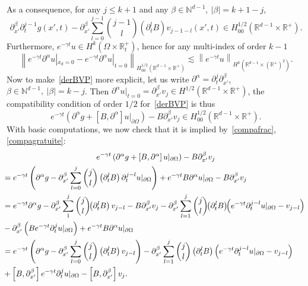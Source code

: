 \documentclass[AHL,Unicode,longabstracts,published]{cedram}
\newcommand{\R}{\mathbb{R}}
\newcommand{\N}{\mathbb{N}}
\newcommand{\N}{\mathbb{N}}
\begin{document}
As a consequence, for any $j\leq k+1$ and any $\beta\in \N^{d-1},\ |\beta|=k+1-j$,
\begin{equation}\label{compafrac}
\partial_{x'}^\beta\partial_t^{j-1}g(x',t) -\partial_{x'}^\beta\sum_{l=0}^{j-1}
\binom{j-1}{l}\left(\partial_t^lB\right)v_{j-1-l}(x',t)\in H^{1/2}_{00}\left(\R^{d-1}\times \R^+\right).
\end{equation}
Furthermore, $e^{-\gamma t}u\in H^k(\Omega
\times \R_t^+)$, hence for any multi-index of order $k-1$
\begin{equation}\label{compagratuite}
\left\|e^{-\gamma t}\partial^\alpha u|_{x_d=0} -e^{-\gamma t}\partial^\alpha u|_{t=0}\right\|_{H^{1/2}_{00}\left(\R^{d-1}\times \R^+\right)}
\lesssim \left\|e^{-\gamma t}u\right\|_{H^{k}\left(\R^{d-1}\times (\R^+)^2\right)}.
\end{equation}
Now to make~\eqref{derBVP} more explicit, let us write $\partial^\alpha=
\partial_t^{j}\partial_{x'}^\beta$, $\beta\in
\N^{d-1},\ |\beta|=k-j$. Then $\partial^\alpha u|_{t=0} =\partial_{x'}^\beta v_{j}\in H^{1/2}(\R^{d-1}\times \R^+)$, the compatibility condition of order $1/2$ for~\eqref{derBVP} is thus
\[
e^{-\gamma t}\left(\partial^\alpha g+ [B,\partial^\alpha]u|_{\partial\Omega}\right) -B\partial_{x'}^\beta v_{j}\in H^{1/2}_{00}\left(\R^{d-1}\times \R^+\right).
\]
With basic computations, we now check that it is implied by~\eqref{compafrac},\eqref{compagratuite}:
\begingroup
\allowdisplaybreaks
\begin{multline*}
e^{-\gamma t}\left(\partial^\alpha g + \left[B,\partial^\alpha\right]u|_{\partial\Omega}\right)-B\partial_{x'}^\beta v_{j}
\\
\mkern-10mu{\begin{aligned}
&= e^{-\gamma t}\left(\partial^\alpha g-\partial_{x'}^\beta
\sum_{l=0}^j\binom{j}{l}\left(\partial_t^lB\right)\partial_t^{j-l}u|_{\partial\Omega}\right) +e^{-\gamma t}B\partial^\alpha u|_{\partial\Omega}-B\partial_{x'}^\beta v_{j}
\\
&=e^{-\gamma t}\partial^\alpha g -\partial_{x'}^\beta \sum_1^j\binom{j}{l}\!\!\left(\partial_t^lB\right) v_{j-l} -B\partial_{x'}^\beta v_{j}
-\partial_{x'}^\beta\sum_{l=1}^j
\binom{j}{l}\!\!\left(\partial_t^lB\right)
\!\!\left(e^{-\gamma t}\partial_t^{j-l}u|_{\partial\Omega} -v_{j-l}\right)\\
& -\partial_{x'}^\beta \left(Be^{-\gamma t}\partial_t^j u|_{\partial\Omega}\right) +e^{-\gamma t}B\partial^\alpha u|_{\partial\Omega}\\
&=e^{-\gamma t}\left(\partial^\alpha g -\partial_{x'}^\beta \sum_{l=0}^j\binom{j}{l}\left(\partial_t^lB\right)v_{j-l}\right)
 -\partial_{x'}^\beta\sum_{l=1}^j
\binom{j}{l}\left(\partial_t^lB\right)
\left(e^{-\gamma t}\partial_t^{j-l}u|_{\partial\Omega}-v_{j-l}\right)\\
&+\left[B,\partial_{x'}^\beta\right]e^{-\gamma t}\partial_t^ju|_{\partial\Omega} -\left[B,\partial_{x'}^\beta\right]v_{j}.
\end{aligned}}
\end{multline*}
\end{document}
